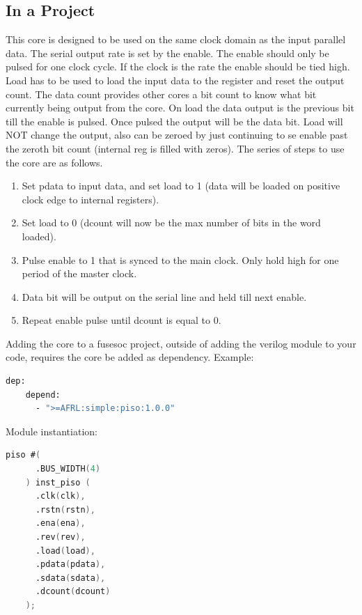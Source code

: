 

\subsection{In a Project}
\par
This core is designed to be used on the same clock domain as the input parallel data. The serial output rate is set by the enable.
The enable should only be pulsed for one clock cycle. If the clock is the rate the enable should be tied high. Load has to be
used to load the input data to the register and reset the output count. The data count provides other cores a bit count to know
what bit currently being output from the core. On load the data output is the previous bit till the enable is pulsed.
Once pulsed the output will be the data bit. Load will NOT change the output, also can be zeroed by just continuing to
se enable past the zeroth bit count (internal reg is filled with zeros).
The series of steps to use the core are as follows.
\begin{enumerate}
  \item Set pdata to input data, and set load to 1 (data will be loaded on positive clock edge to internal registers).
  \item Set load to 0 (dcount will now be the max number of bits in the word loaded).
  \item Pulse enable to 1 that is synced to the main clock. Only hold high for one period of the master clock.
  \item Data bit will be output on the serial line and held till next enable.
  \item Repeat enable pulse until dcount is equal to 0.
\end{enumerate}

Adding the core to a fusesoc project, outside of adding the verilog module to your code, requires the core be added as dependency.
Example:
\begin{lstlisting}[language=bash]
  dep:
    depend:
      - ">=AFRL:simple:piso:1.0.0"
\end{lstlisting}

Module instantiation:
\begin{lstlisting}[language=Verilog]
    piso #(
      .BUS_WIDTH(4)
    ) inst_piso (
      .clk(clk),
      .rstn(rstn),
      .ena(ena),
      .rev(rev),
      .load(load),
      .pdata(pdata),
      .sdata(sdata),
      .dcount(dcount)
    );
\end{lstlisting}

